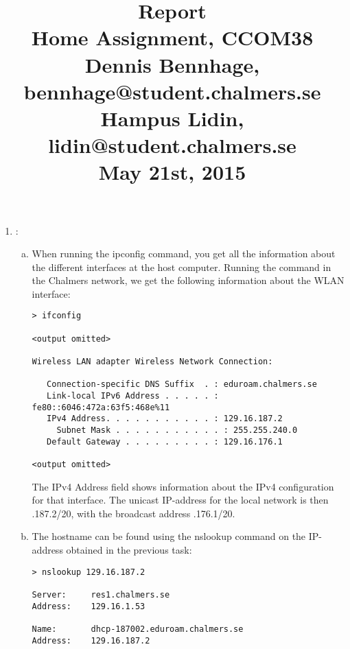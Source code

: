\documentclass[a4paper,9pt,fleqn]{article}
\title{
{\bf Report}\\
\vspace{0.2cm}
%
Home Assignment, CCOM38\\
\vspace{1cm}
%
{
\large
Dennis Bennhage,	bennhage@student.chalmers.se \\
Hampus Lidin,	lidin@student.chalmers.se
}
\\
\vspace{10cm}
%
May 21st, 2015
}
\date{}
\begin{document}
\maketitle

\newpage

\begin{enumerate}[{Task} 1]
	\item :
	\begin{enumerate}[a)]
		\item 
		When running the {\outp ipconfig} command, you get all the
		information about the different interfaces at the host computer. Running the
		command in the Chalmers network, we get the following information
		about the WLAN interface:
			
\begin{lstlisting}
> ifconfig

<output omitted>

Wireless LAN adapter Wireless Network Connection:

   Connection-specific DNS Suffix  . : eduroam.chalmers.se
   Link-local IPv6 Address . . . . . : fe80::6046:472a:63f5:468e%11
   IPv4 Address. . . . . . . . . . . : 129.16.187.2
	 Subnet Mask . . . . . . . . . . . : 255.255.240.0
   Default Gateway . . . . . . . . . : 129.16.176.1

<output omitted>
\end{lstlisting}

		The {\outp IPv4 Address} field shows information about the IPv4 configuration for that
		interface. The unicast IP-address for the local network is then {.187.2/20},
		with the broadcast address {.176.1/20}. %
    \\
		\item 
		The hostname can be found using the {\outp nslookup} command on the IP-address
		obtained in the previous task:

\begin{lstlisting}
> nslookup 129.16.187.2

Server:		res1.chalmers.se
Address:	129.16.1.53

Name:		dhcp-187002.eduroam.chalmers.se
Address:	129.16.187.2
\end{lstlisting}


\end{enumerate}
\end{enumerate}
\end{document}
